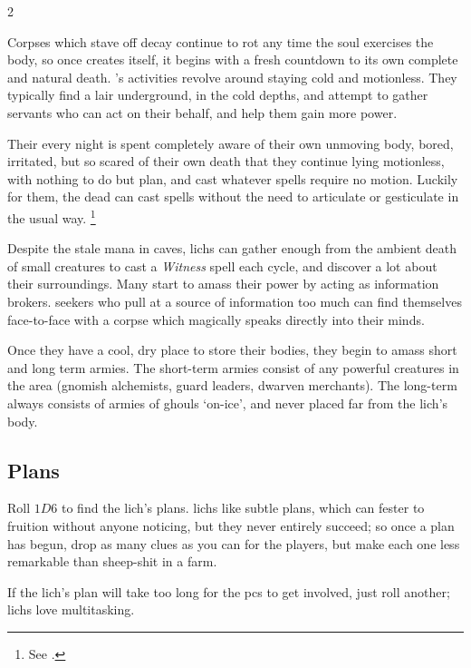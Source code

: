 \begin{multicols}{2}

\noindent
Corpses which stave off decay continue to rot any time the soul exercises the body, so once  creates itself, it begins with a fresh countdown to its own complete and natural death.
's activities revolve around staying cold and motionless.
They typically find a lair underground, in the cold depths, and attempt to gather servants who can act on their behalf, and help them gain more power.

Their every night is spent completely aware of their own unmoving body, bored, irritated, but so scared of their own death that they continue lying motionless, with nothing to do but plan, and cast whatever spells require no motion.
Luckily for them, the dead can cast spells without the need to articulate or gesticulate in the usual way.%
\footnote{See .}

Despite the stale mana in caves, \glspl{lich} can gather enough from the ambient death of small creatures to cast a \textit{Witness} \gls{spell} each \gls{cycle}, and discover a lot about their surroundings.
Many start to amass their power by acting as information brokers.
\Glspl{seeker} who pull at a source of information too much can find themselves face-to-face with a corpse which magically speaks directly into their minds.

\lich

Once they have a cool, dry place to store their bodies, they begin to amass short and long term armies.
The short-term armies consist of any powerful creatures in the area (gnomish alchemists, \gls{guard} leaders, dwarven merchants).
The long-term always consists of armies of \glspl{ghoul} `on-ice', and never placed far from the \gls{lich}'s body.

\showStdSpells

\subsection{Plans}

Roll $1D6$ to find the \gls{lich}'s plans.
\Glspl{lich} like subtle plans, which can fester to fruition without anyone noticing, but they never entirely succeed; so once a plan has begun, drop as many clues as you can for the players, but make each one less remarkable than sheep-shit in a farm.

If the \gls{lich}'s plan will take too long for the \glspl{pc} to get involved, just roll another; \glspl{lich} love multitasking.


\end{multicols}
